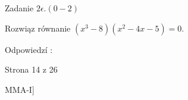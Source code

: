 \documentclass[a4paper,12pt]{article}
\begin{document}
Zadanie $2\epsilon. (0-2)$

Rozwiąz równanie $(x^{3}-8)(x^{2}-4x-5)=0.$

Odpowiedzí :

Strona 14 z 26

MMA-I]
\end{document}
